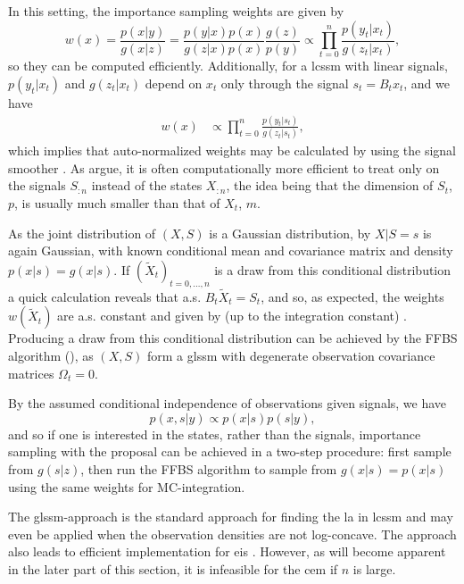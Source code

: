 In this setting, the importance sampling weights are given by 
$$
w(x) = \frac{p(x|y)}{g(x|z)} = \frac{p(y|x)p(x)}{g(z|x)p(x)} \frac{g(z)}{p(y)} \propto \prod_{t = 0}^n \frac{p(y_{t}|x_{t})}{g(z_{t}|x_{t})},
$$
so they can be computed efficiently. Additionally, for a \acrshort{lcssm} with linear signals, $p(y_{t}|x_{t})$ and $g(z_{t}|x_{t})$ depend on $x_{t}$ only through the signal $s_{t} = B_{t}x_{t}$, and we have 
\begin{align}
\label{eq:weights_only_on_signal}
w(x) &\propto \prod_{t = 0}^{n}\frac{p(y_{t}|s_{t})}{g(z_{t}|s_{t})},
\end{align}
which implies that auto-normalized weights may be calculated by using the signal smoother \citep[Theorem 2]{Jungbacker2007Monte}.
As \citep{Durbin2012Time} \citep[Section 4.5.3]{Durbin2012Time} argue, it is often computationally more efficient to treat only on the signals $S_{:n}$ instead of the states $X_{:n}$, the idea being that the dimension of $S_{t}$, $p$, is usually much smaller than that of $X_{t}$, $m$. 

As the joint distribution of $(X, S)$ is a Gaussian distribution, by  $X|S = s$ is again Gaussian,
with known conditional mean and covariance matrix and density $p(x|s) = g(x|s)$. If $(\tilde X_{t})_{t=0,\dots,n}$ is a draw from this conditional distribution a quick calculation reveals that a.s. $B_{t} \tilde X_{t} = S_{t}$, and so, as expected, the weights $w(\tilde X_{t})$ are a.s. constant and given by (up to the integration constant) . Producing a draw from this conditional distribution can be achieved by the FFBS algorithm (), as $(X, S)$ form a \gls{glssm} with degenerate observation covariance matrices $\Omega_{t} = 0$.

By the assumed conditional independence of observations given signals, we have
$$
p(x, s|y) \propto p(x|s) p(s|y),
$$
and so if one is interested in the states, rather than the signals, importance sampling with the proposal  can be achieved in a two-step procedure: first sample from $g(s|z)$, then run the FFBS algorithm to sample from $g(x|s) = p(x|s)$ using the same weights for MC-integration. 

The \gls{glssm}-approach is the standard approach for finding the \gls{la} in \gls{lcssm} \citep{Durbin1997Monte,Durbin2012Time} and may even be applied when the observation densities are not log-concave\citep{Jungbacker2007Monte}. The approach also leads to efficient implementation for \gls{eis} \citep{Koopman2019Modified}. However, as will become apparent in the later part of this section, it is infeasible for the \gls{cem} if $n$ is large. 


